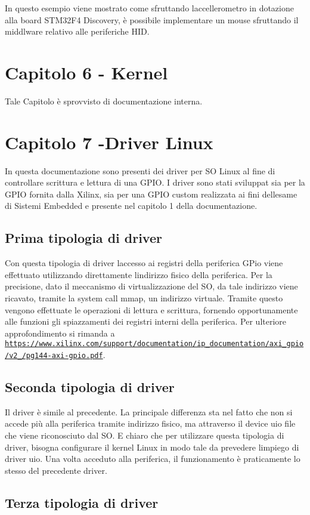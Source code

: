 In questo esempio viene mostrato come sfruttando l\textquotesingle{}accellerometro in dotazione alla board S\+T\+M32\+F4 Discovery, è possibile implementare un mouse sfruttando il middlware relativo alle periferiche H\+ID. \hypertarget{index_six}{}\section{Capitolo 6  -\/ Kernel}\label{index_six}
Tale Capitolo è sprovvisto di documentazione interna. \hypertarget{index_secondintro}{}\section{Capitolo 7  -\/\+Driver Linux}\label{index_secondintro}
In questa documentazione sono presenti dei driver per SO Linux al fine di controllare scrittura e lettura di una G\+P\+IO. I driver sono stati sviluppat sia per la G\+P\+IO fornita dalla Xilinx, sia per una G\+P\+IO custom realizzata ai fini dell\textquotesingle{}esame di Sistemi Embedded e presente nel capitolo 1 della documentazione. \hypertarget{index_seven}{}\subsection{Prima tipologia di driver}\label{index_seven}
Con questa tipologia di driver l\textquotesingle{}accesso ai registri della periferica G\+Pio viene effettuato utilizzando direttamente l\textquotesingle{}indirizzo fisico della periferica. Per la precisione, dato il meccanismo di virtualizzazione del SO, da tale indirizzo viene ricavato, tramite la system call mmap, un indirizzo virtuale. Tramite questo vengono effettuate le operazioni di lettura e scrittura, fornendo opportunamente alle funzioni gli spiazzamenti dei registri interni della periferica. Per ulteriore approfondimento si rimanda a \href{https://www.xilinx.com/support/documentation/ip_documentation/axi_gpio/v2_0/pg144-axi-gpio.pdf}{\tt https\+://www.\+xilinx.\+com/support/documentation/ip\+\_\+documentation/axi\+\_\+gpio/v2\+\_/pg144-\/axi-\/gpio.\+pdf}. \hypertarget{index_sevensecond}{}\subsection{Seconda tipologia di driver}\label{index_sevensecond}
Il driver è simile al precedente. La principale differenza sta nel fatto che non si accede più alla periferica tramite indirizzo fisico, ma attraverso il device uio file che viene riconosciuto dal SO. E\textquotesingle{} chiaro che per utilizzare questa tipologia di driver, bisogna configurare il kernel Linux in modo tale da prevedere l\textquotesingle{}impiego di driver uio. Una volta acceduto alla periferica, il funzionamento è praticamente lo stesso del precedente driver. \hypertarget{index_seventhird}{}\subsection{Terza tipologia di driver}\label{index_seventhird}

